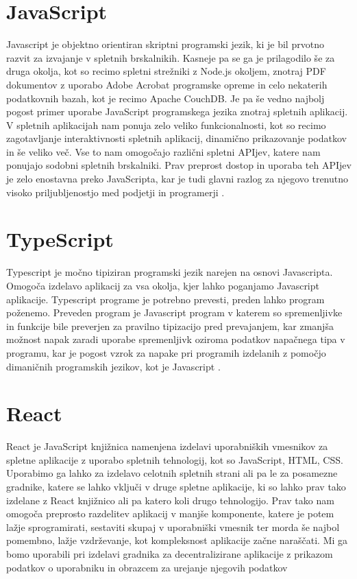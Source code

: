 \documentclass[a4paper,12pt,openright]{book}
\begin{document}
\section{JavaScript}
Javascript je objektno orientiran skriptni programski jezik, ki je bil prvotno razvit za izvajanje v spletnih brskalnikih.
Kasneje pa se ga je prilagodilo še za druga okolja, kot so recimo spletni strežniki z Node.js okoljem, znotraj PDF
dokumentov z uporabo Adobe Acrobat programske opreme in celo nekaterih podatkovnih bazah, kot je recimo Apache CouchDB.
Je pa še vedno najbolj pogost primer uporabe JavaScript programskega jezika znotraj spletnih aplikacij.
V spletnih aplikacijah nam ponuja zelo veliko funkcionalnosti, kot so recimo zagotavljanje interaktivnosti spletnih
aplikacij, dinamično prikazovanje podatkov in še veliko več.
Vse to nam omogočajo različni spletni APIjev, katere nam ponujajo sodobni spletnih brskalniki.
Prav preprost dostop in uporaba teh APIjev je zelo enostavna preko JavaScripta, kar je tudi glavni razlog za njegovo
trenutno visoko priljubljenostjo med podjetji in programerji \cite{javascript_mozilla}.

\section{TypeScript}
Typescript je močno tipiziran programski jezik narejen na osnovi Javascripta. 
Omogoča izdelavo aplikacij za vsa okolja, kjer lahko poganjamo Javascript aplikacije.
Typescript programe je potrebno prevesti, preden lahko program poženemo.
Preveden program je Javascript program v katerem so spremenljivke in funkcije bile preverjen za pravilno tipizacijo 
pred prevajanjem, kar zmanjša možnost napak zaradi uporabe spremenljivk oziroma podatkov napačnega tipa v programu, 
kar je pogost vzrok za napake pri programih izdelanih z pomočjo dimaničnih programskih jezikov, kot je Javascript \cite{typescript_homepage}.

\section{React}
React je JavaScript knjižnica namenjena izdelavi uporabniških vmesnikov za spletne aplikacije z uporabo spletnih tehnologij, kot so JavaScript, HTML, CSS.
Uporabimo ga lahko za izdelavo celotnih spletnih strani ali pa le za posamezne gradnike, katere se lahko vključi v 
druge spletne aplikacije, ki so lahko prav tako izdelane z React knjižnico ali pa katero koli drugo tehnologijo.
Prav tako nam omogoča preprosto razdelitev aplikacij v manjše komponente, katere je potem lažje sprogramirati, sestaviti skupaj v uporabniški vmesnik
ter morda še najbol pomembno, lažje vzdrževanje, kot kompleksnost aplikacije začne naraščati.
Mi ga bomo uporabili pri izdelavi gradnika za decentralizirane aplikacije z prikazom podatkov o uporabniku in obrazcem za urejanje njegovih podatkov \cite{react_homepage}
\end{document}
